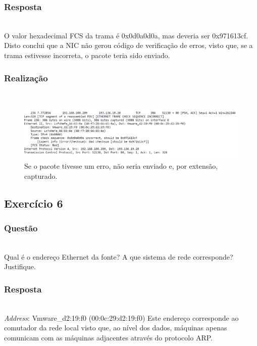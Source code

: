 \documentclass{llncs}
\begin{document}
\subsubsection{Resposta}\rule[-10pt]{0pt}{10pt}\\

O valor hexadecimal FCS da trama é 0x0d0a0d0a, mas deveria ser 0x971613cf. Disto conclui que a NIC não gerou código de verificação de erros, visto que, se a trama estivesse incorreta, o pacote teria sido enviado.

\subsubsection{Realização}\rule[-10pt]{0pt}{10pt}\\

\begin{figure}
  \begin{center}
  \includegraphics[scale=0.35]{imagens/FCS.png} 
  \end{center}
  \caption{Se o pacote tivesse um erro, não seria enviado e, por extensão, capturado.}
  \label{fig:fcs_field}
\end{figure} 

\clearpage
\subsection{Exercício 6}
\subsubsection{Questão}\rule[-10pt]{0pt}{10pt}\\

Qual é o endereço Ethernet da fonte? A que sistema de rede corresponde? Justifique.

\subsubsection{Resposta}\rule[-10pt]{0pt}{10pt}\\

\textit{Address}: Vmware_d2:19:f0 (00:0c:29:d2:19:f0)
Este endereço corresponde ao comutador da rede local visto que, ao nível dos dados, máquinas apenas comunicam com as máquinas adjacentes através do protocolo ARP.
\end{document}
